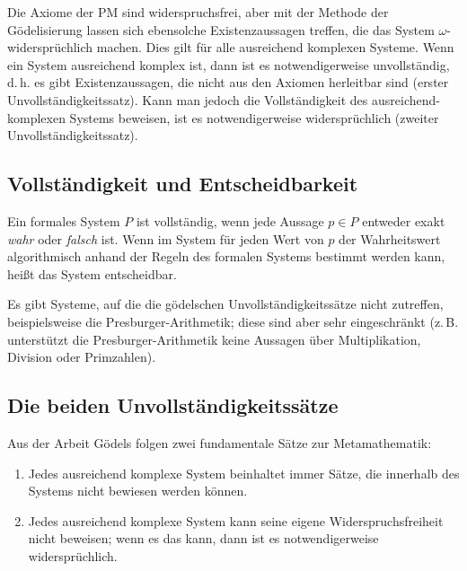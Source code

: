 Die Axiome der PM sind widerspruchsfrei, aber mit der Methode der Gödelisierung
lassen sich ebensolche Existenzaussagen treffen, die das System $\omega$-widersprüchlich
machen. Dies gilt für alle ausreichend komplexen
Systeme. Wenn ein System ausreichend komplex ist, dann ist es notwendigerweise unvollständig,
d.\,h. es gibt Existenzaussagen, die nicht aus den Axiomen herleitbar sind (erster
Unvollständigkeitssatz). Kann man jedoch die
Vollständigkeit des ausreichend-komplexen Systems beweisen, ist es notwendigerweise 
widersprüchlich (zweiter Unvollständigkeitssatz).

\subsection*{Vollständigkeit und Entscheidbarkeit}

Ein formales System $P$ ist vollständig, wenn jede Aussage $p \in P$ entweder 
exakt \textit{wahr} oder \textit{falsch} ist. Wenn im System für jeden Wert
von $p$ der  Wahrheitswert algorithmisch anhand der Regeln des
formalen Systems bestimmt werden kann, heißt das System \frq entscheidbar\flq.

Es gibt Systeme, auf die die gödelschen Unvollständigkeitssätze nicht zutreffen, beispielsweise die Presburger-Arithmetik; 
diese sind aber sehr eingeschränkt
(z.\,B. unterstützt die Presburger-Arithmetik keine Aussagen über Multiplikation,
Division oder Primzahlen).

\subsection*{Die beiden Unvollständigkeitssätze}

Aus der Arbeit Gödels folgen zwei fundamentale Sätze zur Metamathematik:

\begin{enumerate}
	\item Jedes ausreichend komplexe System beinhaltet immer Sätze, die innerhalb
		des Systems nicht bewiesen werden können.
	\item Jedes ausreichend komplexe System kann seine eigene Widerspruchsfreiheit
		nicht beweisen; wenn es das kann, dann ist es
		notwendigerweise widersprüchlich.
\end{enumerate}

